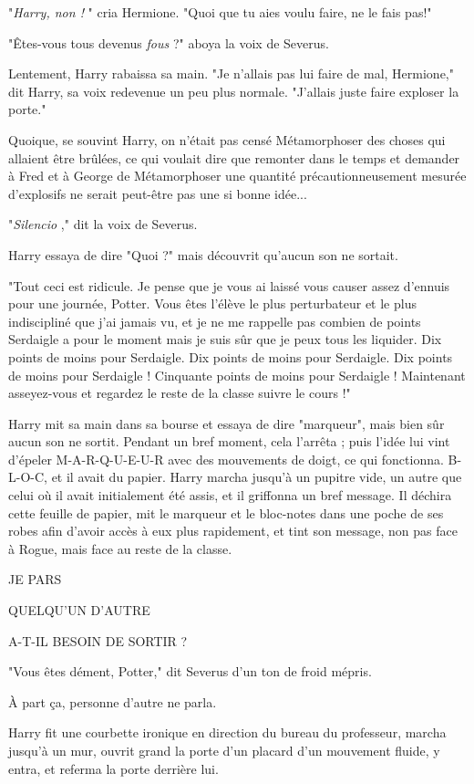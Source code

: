 "\emph{Harry, non !} " cria Hermione. "Quoi que tu aies voulu faire, ne le fais pas!"

"Êtes-vous tous devenus \emph{fous}  ?" aboya la voix de Severus.

Lentement, Harry rabaissa sa main. "Je n'allais pas lui faire de mal, Hermione," dit Harry, sa voix redevenue un peu plus normale. "J'allais juste faire exploser la porte."

Quoique, se souvint Harry, on n'était pas censé Métamorphoser des choses qui allaient être brûlées, ce qui voulait dire que remonter dans le temps et demander à Fred et à George de Métamorphoser une quantité précautionneusement mesurée d'explosifs ne serait peut-être pas une si bonne idée...

"\emph{Silencio} ," dit la voix de Severus.

Harry essaya de dire "Quoi ?" mais découvrit qu'aucun son ne sortait.

"Tout ceci est ridicule. Je pense que je vous ai laissé vous causer assez d'ennuis pour une journée, Potter. Vous êtes l'élève le plus perturbateur et le plus indiscipliné que j'ai jamais vu, et je ne me rappelle pas combien de points Serdaigle a pour le moment mais je suis sûr que je peux tous les liquider. Dix points de moins pour Serdaigle. Dix points de moins pour Serdaigle. Dix points de moins pour Serdaigle ! Cinquante points de moins pour Serdaigle ! Maintenant asseyez-vous et regardez le reste de la classe suivre le cours !"

Harry mit sa main dans sa bourse et essaya de dire "marqueur", mais bien sûr aucun son ne sortit. Pendant un bref moment, cela l'arrêta ; puis l'idée lui vint d'épeler M-A-R-Q-U-E-U-R avec des mouvements de doigt, ce qui fonctionna. B-L-O-C, et il avait du papier. Harry marcha jusqu'à un pupitre vide, un autre que celui où il avait initialement été assis, et il griffonna un bref message. Il déchira cette feuille de papier, mit le marqueur et le bloc-notes dans une poche de ses robes afin d'avoir accès à eux plus rapidement, et tint son message, non pas face à Rogue, mais face au reste de la classe.

JE PARS

QUELQU'UN D'AUTRE

A-T-IL BESOIN DE SORTIR ?

"Vous êtes dément, Potter," dit Severus d'un ton de froid mépris.

À part ça, personne d'autre ne parla.

Harry fit une courbette ironique en direction du bureau du professeur, marcha jusqu'à un mur, ouvrit grand la porte d'un placard d'un mouvement fluide, y entra, et referma la porte derrière lui.

